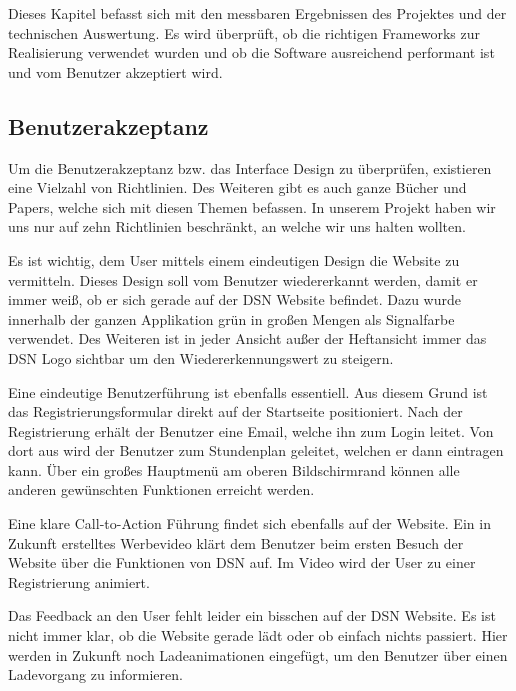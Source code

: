 Dieses Kapitel befasst sich mit den messbaren Ergebnissen des Projektes und der technischen Auswertung. Es wird überprüft, ob die richtigen Frameworks zur Realisierung verwendet wurden und ob die Software ausreichend performant ist und vom Benutzer akzeptiert wird.

\subsection{Benutzerakzeptanz}
Um die Benutzerakzeptanz bzw. das Interface Design zu überprüfen, existieren eine Vielzahl von Richtlinien. Des Weiteren gibt es auch ganze Bücher und Papers, welche sich mit diesen Themen befassen. In unserem Projekt haben wir uns nur auf zehn Richtlinien\cite{INTDES1} beschränkt, an welche wir uns halten wollten. 

Es ist wichtig, dem User mittels einem eindeutigen Design die Website zu vermitteln. Dieses Design soll vom Benutzer wiedererkannt werden, damit er immer weiß, ob er sich gerade auf der DSN Website befindet. Dazu wurde innerhalb der ganzen Applikation grün in großen Mengen als Signalfarbe verwendet. Des Weiteren ist in jeder Ansicht außer der Heftansicht immer das DSN Logo sichtbar um den Wiedererkennungswert zu steigern.

Eine eindeutige Benutzerführung ist ebenfalls essentiell. Aus diesem Grund ist das Registrierungsformular direkt auf der Startseite positioniert. Nach der Registrierung erhält der Benutzer eine Email, welche ihn zum Login leitet. Von dort aus wird der Benutzer zum Stundenplan geleitet, welchen er dann eintragen kann. Über ein großes Hauptmenü am oberen Bildschirmrand können alle anderen gewünschten Funktionen erreicht werden.

Eine klare Call-to-Action Führung findet sich ebenfalls auf der Website. Ein in Zukunft erstelltes Werbevideo klärt dem Benutzer beim ersten Besuch der Website über die Funktionen von DSN auf. Im Video wird der User zu einer Registrierung animiert.

Das Feedback an den User fehlt leider ein bisschen auf der DSN Website. Es ist nicht immer klar, ob die Website gerade lädt oder ob einfach nichts passiert. Hier werden in Zukunft noch Ladeanimationen eingefügt, um den Benutzer über einen Ladevorgang zu informieren.

